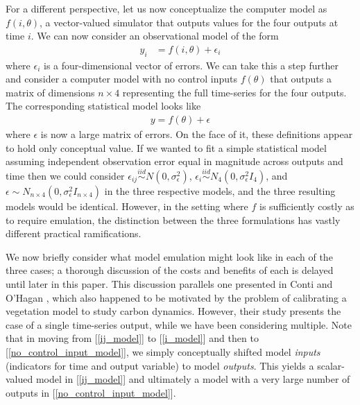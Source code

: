 \documentclass[12pt]{article}
\begin{document}
For a different perspective, let us now conceptualize the computer model as $f(i, \theta)$, a vector-valued simulator that outputs values for the four outputs
at time $i$. We can now consider an observational model of the form 
\begin{align}
y_{i} &= f(i, \theta) + \epsilon_{i} \label{i_model}
\end{align}
where $\epsilon_{i}$ is a four-dimensional vector of errors. We can take this a step further and consider a computer model with no control inputs
$f(\theta)$ that outputs a matrix of dimensions $n \times 4$ representing the full time-series for the four outputs. The corresponding statistical model looks 
like
\begin{align}
y = f(\theta) + \epsilon \label{no_control_input_model}
\end{align}
where $\epsilon$ is now a large matrix of errors. On the face of it, these definitions appear to hold only conceptual value. If we wanted to fit a simple 
statistical model assuming independent observation error equal in magnitude across outputs and time then we could consider 
$\epsilon_{ij} \overset{iid}{\sim} N(0, \sigma_\epsilon^2)$, 
$\epsilon_i \overset{iid}{\sim} N_4(0, \sigma_\epsilon^2 I_4)$, and $\epsilon \sim N_{n \times 4}(0, \sigma_\epsilon^2 I_{n \times 4})$ 
in the three respective models, and the three resulting models would be identical. However, in the setting where $f$ is sufficiently costly 
as to require emulation, the distinction between the three formulations has vastly different practical ramifications. 

We now briefly consider what model emulation might look like in each of the three cases; a thorough discussion of the costs and benefits of each 
is delayed until later in this paper. This discussion parallels one presented in 
Conti and O'Hagan \cite{Conti}, which also happened to be motivated by the problem of calibrating a vegetation model to study 
carbon dynamics. However, their study presents the case of a single time-series output, while we have been considering multiple. 
Note that in moving from [\ref{ij_model}] to 
[\ref{i_model}] and then to [\ref{no_control_input_model}], we simply conceptually shifted model \textit{inputs} (indicators for time and 
output variable) to model \textit{outputs}. This yields a scalar-valued model in [\ref{ij_model}] and ultimately a model with a very large 
number of outputs in [\ref{no_control_input_model}]. 
\end{document}

